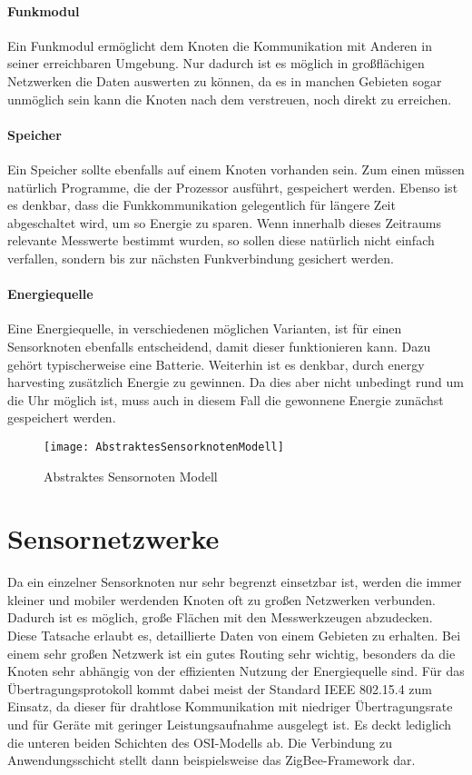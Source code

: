\paragraph{Funkmodul} Ein Funkmodul ermöglicht dem Knoten die Kommunikation mit Anderen in seiner erreichbaren Umgebung. Nur dadurch ist es möglich in großflächigen Netzwerken die Daten auswerten zu können, da es in manchen Gebieten sogar unmöglich sein kann die Knoten nach dem verstreuen, noch direkt zu erreichen.
\paragraph{Speicher} Ein Speicher sollte ebenfalls auf einem Knoten vorhanden sein. Zum einen müssen natürlich Programme, die der Prozessor ausführt, gespeichert werden. Ebenso ist es denkbar, dass die Funkkommunikation gelegentlich für längere Zeit abgeschaltet wird, um so Energie zu sparen. Wenn innerhalb dieses Zeitraums relevante Messwerte bestimmt wurden, so sollen diese natürlich nicht einfach verfallen, sondern bis zur nächsten Funkverbindung gesichert werden.
\paragraph{Energiequelle} Eine Energiequelle, in verschiedenen möglichen Varianten, ist für einen Sensorknoten ebenfalls entscheidend, damit dieser funktionieren kann. Dazu gehört typischerweise eine Batterie. Weiterhin ist es denkbar, durch energy harvesting zusätzlich Energie zu gewinnen. Da dies aber nicht unbedingt rund um die Uhr möglich ist, muss auch in diesem Fall die gewonnene Energie zunächst gespeichert werden.

\begin{figure}[htbp]
\centering
\caption{Abstraktes Sensornoten Modell}
\label{fig:sensornode}
\texttt{[image: AbstraktesSensorknotenModell]}
\end{figure}

\section{Sensornetzwerke}

Da ein einzelner Sensorknoten nur sehr begrenzt einsetzbar ist, werden die immer kleiner und mobiler werdenden Knoten oft zu großen Netzwerken verbunden. Dadurch ist es möglich, große Flächen mit den Messwerkzeugen abzudecken. Diese Tatsache erlaubt es, detaillierte Daten von einem Gebieten zu erhalten.\newline
Bei einem sehr großen Netzwerk ist ein gutes Routing sehr wichtig, besonders da die Knoten sehr abhängig von der effizienten Nutzung der Energiequelle sind. Für das Übertragungsprotokoll kommt dabei meist der Standard IEEE 802.15.4 zum Einsatz, da dieser für drahtlose Kommunikation mit niedriger Übertragungsrate und für Geräte mit geringer Leistungsaufnahme ausgelegt ist. Es deckt lediglich die unteren beiden Schichten des OSI-Modells ab.\newline
Die Verbindung zu Anwendungsschicht stellt dann beispielsweise das ZigBee-Framework dar. \\
